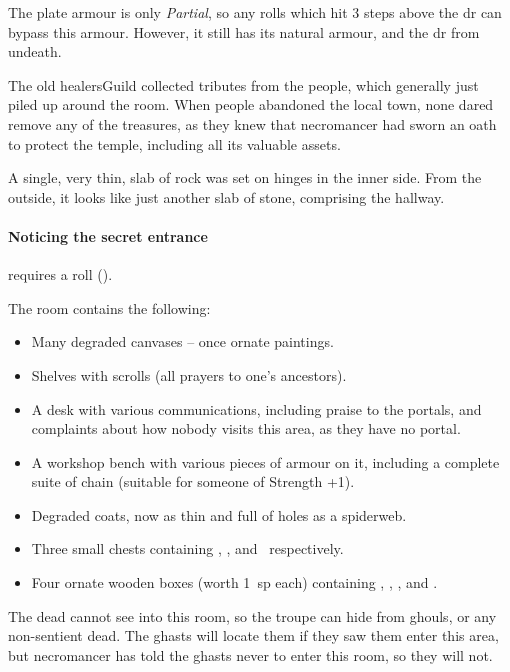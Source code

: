The plate armour is only \textit{Partial}, so any rolls which hit 3 steps above the \gls{dr} can bypass this armour.
However, it still has its natural armour, and the \gls{dr} from undeath.%

\undeadBasilisk


\begin{exampletext}
The old \gls{healersGuild} collected tributes from the people, which generally just piled up around the room.
When people abandoned the local town, none dared remove any of the treasures, as they knew that \gls{necromancer} had sworn an oath to protect the temple, including all its valuable assets.
\end{exampletext}

A single, very thin, slab of rock was set on hinges in the inner side.
From the outside, it looks like just another slab of stone, comprising the hallway.
\paragraph{Noticing the secret entrance}
requires a  roll (\tn[12]).

The room contains the following:

\begin{itemize}
\item
Many degraded canvases -- once ornate paintings.
\item
Shelves with scrolls (all prayers to one's ancestors).
\item
A desk with various communications, including praise to the portals, and complaints about how nobody visits this area, as they have no portal.
\item
A workshop bench with various pieces of armour on it, including a complete suite of chain (suitable for someone of Strength +1).
\item
Degraded coats, now as thin and full of holes as a spiderweb.
\item
Three small chests containing \lootMedium, \lootBig, and \lootBig\ respectively.
\item
Four ornate wooden boxes (worth 1~\gls{sp} each) containing \lootJewellery, \lootJewellery, \lootJewellery, and \lootJewellery.
\end{itemize}

The dead cannot see into this room, so the troupe can hide from ghouls, or any non-sentient dead.
The ghasts will locate them if they saw them enter this area, but \gls{necromancer} has told the ghasts never to enter this room, so they will not.

